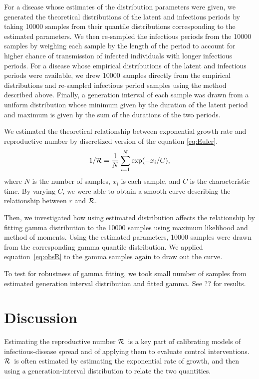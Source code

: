 \documentclass[12pt,]{article}
\newcommand{\RR}{\ensuremath{{\cal R}}}
\begin{document}
For a disease whose estimates of the distribution parameters were given, we generated the theoretical distributions of the latent and infectious periods by taking 10000 samples from their quantile distributions corresponding to the estimated parameters. We then re-sampled the infectious periods from the 10000 samples by weighing each sample by the length of the period to account for higher chance of transmission of infected individuals with longer infectious periods. 
For a disease whose empirical distributions of the latent and infectious periods were available, we drew 10000 samples directly from the empirical distributions and re-sampled infectious period samples using the method described above.
Finally, a generation interval of each sample was drawn from a uniform distribution whose minimum given by the duration of the latent period and maximum is given by the sum of the durations of the two periods.

We estimated the theoretical relationship between exponential growth rate and reproductive number by discretized version of the equation \ref{eq:Euler}.
\begin{equation}
1/\RR = \frac{1}{N} \sum_{i=1}^{N} \exp(-x_i/C),
\label{eq:obsR}
\end{equation}
where $N$ is the number of samples, $x_i$ is each sample, and $C$ is the characteristic time. By varying $C$, we were able to obtain a smooth curve describing the relationship between $r$ and $\RR$.

Then, we investigated how using estimated distribution affects the relationship by fitting gamma distribution to the 10000 samples using maximum likelihood and method of moments. Using the estimated parameters, 10000 samples were drawn from the corresponding gamma quantile distribution. We applied equation~\ref{eq:obsR} to the gamma samples again to draw out the curve.

To test for robustness of gamma fitting, we took small number of samples from estimated generation interval distribution and fitted gamma. See ?? for results.

\section{Discussion}

Estimating the reproductive number \RR\ is a key part of calibrating models of infectious-disease spread and of applying them to evaluate control interventions. \RR\ is often estimated by estimating the exponential rate of growth, and then using a generation-interval distribution to relate the two quantities. 
\end{document}
